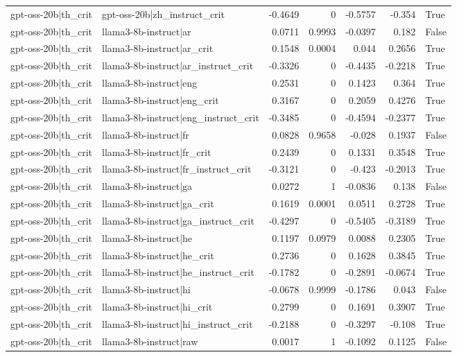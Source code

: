 \begin{table}
\begin{tabular}{l l r r r r l}
gpt-oss-20b|th_crit & gpt-oss-20b|zh_instruct_crit & -0.4649 & 0 & -0.5757 & -0.354 & True \\
gpt-oss-20b|th_crit & llama3-8b-instruct|ar & 0.0711 & 0.9993 & -0.0397 & 0.182 & False \\
gpt-oss-20b|th_crit & llama3-8b-instruct|ar_crit & 0.1548 & 0.0004 & 0.044 & 0.2656 & True \\
gpt-oss-20b|th_crit & llama3-8b-instruct|ar_instruct_crit & -0.3326 & 0 & -0.4435 & -0.2218 & True \\
gpt-oss-20b|th_crit & llama3-8b-instruct|eng & 0.2531 & 0 & 0.1423 & 0.364 & True \\
gpt-oss-20b|th_crit & llama3-8b-instruct|eng_crit & 0.3167 & 0 & 0.2059 & 0.4276 & True \\
gpt-oss-20b|th_crit & llama3-8b-instruct|eng_instruct_crit & -0.3485 & 0 & -0.4594 & -0.2377 & True \\
gpt-oss-20b|th_crit & llama3-8b-instruct|fr & 0.0828 & 0.9658 & -0.028 & 0.1937 & False \\
gpt-oss-20b|th_crit & llama3-8b-instruct|fr_crit & 0.2439 & 0 & 0.1331 & 0.3548 & True \\
gpt-oss-20b|th_crit & llama3-8b-instruct|fr_instruct_crit & -0.3121 & 0 & -0.423 & -0.2013 & True \\
gpt-oss-20b|th_crit & llama3-8b-instruct|ga & 0.0272 & 1 & -0.0836 & 0.138 & False \\
gpt-oss-20b|th_crit & llama3-8b-instruct|ga_crit & 0.1619 & 0.0001 & 0.0511 & 0.2728 & True \\
gpt-oss-20b|th_crit & llama3-8b-instruct|ga_instruct_crit & -0.4297 & 0 & -0.5405 & -0.3189 & True \\
gpt-oss-20b|th_crit & llama3-8b-instruct|he & 0.1197 & 0.0979 & 0.0088 & 0.2305 & True \\
gpt-oss-20b|th_crit & llama3-8b-instruct|he_crit & 0.2736 & 0 & 0.1628 & 0.3845 & True \\
gpt-oss-20b|th_crit & llama3-8b-instruct|he_instruct_crit & -0.1782 & 0 & -0.2891 & -0.0674 & True \\
gpt-oss-20b|th_crit & llama3-8b-instruct|hi & -0.0678 & 0.9999 & -0.1786 & 0.043 & False \\
gpt-oss-20b|th_crit & llama3-8b-instruct|hi_crit & 0.2799 & 0 & 0.1691 & 0.3907 & True \\
gpt-oss-20b|th_crit & llama3-8b-instruct|hi_instruct_crit & -0.2188 & 0 & -0.3297 & -0.108 & True \\
gpt-oss-20b|th_crit & llama3-8b-instruct|raw & 0.0017 & 1 & -0.1092 & 0.1125 & False \\

\end{tabular}
\end{table}
